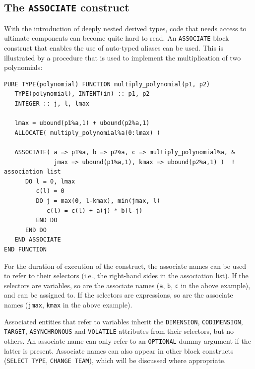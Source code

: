 \documentclass[
  paper=a4,
  ,captions=tableheading
]{scrartcl}
\newcommand{\passthrough}[1]{#1}
\begin{document}
\subsection{\texorpdfstring{The \texttt{ASSOCIATE}
construct}{The ASSOCIATE construct}}\label{the-associate-construct}

With the introduction of deeply nested derived types, code that needs
access to ultimate components can become quite hard to read. An
\passthrough{\lstinline!ASSOCIATE!} block construct that enables the use
of auto-typed aliases can be used. This is illustrated by a procedure
that is used to implement the multiplication of two polynomials:

\begin{lstlisting}
PURE TYPE(polynomial) FUNCTION multiply_polynomial(p1, p2)
   TYPE(polynomial), INTENT(in) :: p1, p2
   INTEGER :: j, l, lmax

   lmax = ubound(p1%a,1) + ubound(p2%a,1)
   ALLOCATE( multiply_polynomial%a(0:lmax) )

   ASSOCIATE( a => p1%a, b => p2%a, c => multiply_polynomial%a, &
              jmax => ubound(p1%a,1), kmax => ubound(p2%a,1) )  ! association list
      DO l = 0, lmax
         c(l) = 0
         DO j = max(0, l-kmax), min(jmax, l)
            c(l) = c(l) + a(j) * b(l-j)
         END DO
      END DO
   END ASSOCIATE
END FUNCTION
\end{lstlisting}

For the duration of execution of the construct, the associate names can
be used to refer to their selectors (i.e., the right-hand sides in the
association list). If the selectors are variables, so are the associate
names (\passthrough{\lstinline!a!}, \passthrough{\lstinline!b!},
\passthrough{\lstinline!c!} in the above example), and can be assigned
to. If the selectors are expressions, so are the associate names
(\passthrough{\lstinline!jmax!}, \passthrough{\lstinline!kmax!} in the
above example).

Associated entities that refer to variables inherit the
\passthrough{\lstinline!DIMENSION!},
\passthrough{\lstinline!CODIMENSION!}, \passthrough{\lstinline!TARGET!},
\passthrough{\lstinline!ASYNCHRONOUS!} and
\passthrough{\lstinline!VOLATILE!} attributes from their selectors, but
no others. An associate name can only refer to an
\passthrough{\lstinline!OPTIONAL!} dummy argument if the latter is
present. Associate names can also appear in other block constructs
(\passthrough{\lstinline!SELECT TYPE!},
\passthrough{\lstinline!CHANGE TEAM!}), which will be discussed where
appropriate.
\end{document}
